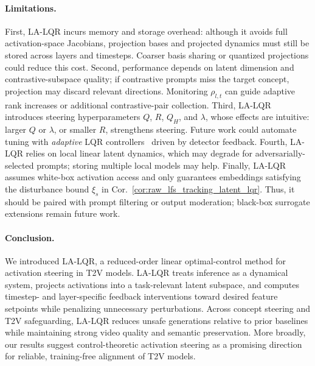 \documentclass{article}
\begin{document}
\vspace{-8pt}
\paragraph{Limitations.}
First, LA-LQR incurs memory and storage overhead: although it avoids full activation-space Jacobians, projection bases and projected dynamics must still be stored across layers and timesteps. Coarser basis sharing or quantized projections could reduce this cost. Second, performance depends on latent dimension and contrastive-subspace quality; if contrastive prompts miss the target concept, projection may discard relevant directions. Monitoring $\rho_{l,t}$ can guide adaptive rank increases or additional contrastive-pair collection. Third, LA-LQR introduces steering hyperparameters $Q$, $R$, $Q_H$, and $\lambda$, whose effects are intuitive: larger $Q$ or $\lambda$, or smaller $R$, strengthens steering. Future work could automate tuning with \textit{adaptive} LQR controllers~\cite{abbasi2011regret} driven by detector feedback. Fourth, LA-LQR relies on local linear latent dynamics, which may degrade for adversarially-selected prompts; storing multiple local models may help. Finally, LA-LQR assumes white-box activation access and only guarantees embeddings satisfying the disturbance bound $\xi_s$ in Cor.~\ref{cor:raw_lfs_tracking_latent_lqr}. Thus, it should be paired with prompt filtering or output moderation; black-box surrogate extensions remain future work.

\vspace{-8pt}
\paragraph{Conclusion.}
We introduced LA-LQR, a reduced-order linear optimal-control method for activation steering in T2V models. LA-LQR treats inference as a dynamical system, projects activations into a task-relevant latent subspace, and computes timestep- and layer-specific feedback interventions toward desired feature setpoints while penalizing unnecessary perturbations. Across concept steering and T2V safeguarding, LA-LQR reduces unsafe generations relative to prior baselines while maintaining strong video quality and semantic preservation. More broadly, our results suggest control-theoretic activation steering as a promising direction for reliable, training-free alignment of T2V models.



\end{document}
